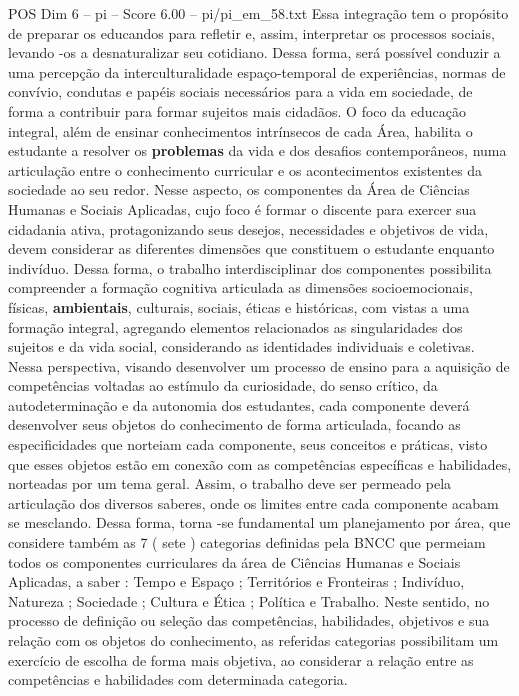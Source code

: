 \begin{textsample}{POS Dim 6 – pi – Score 6.00 – pi/pi\_em\_58.txt}
Essa integração tem o propósito de preparar os educandos para refletir e, assim, interpretar os processos sociais, levando -os a desnaturalizar seu cotidiano.
Dessa forma, será possível conduzir a uma percepção da interculturalidade espaço-temporal de experiências, normas de convívio, condutas e papéis sociais necessários para a vida em sociedade, de forma a contribuir para formar sujeitos mais cidadãos.
O foco da educação integral, além de ensinar conhecimentos intrínsecos de cada Área, habilita o estudante a resolver os \textbf{problemas} da vida e dos desafios contemporâneos, numa articulação entre o conhecimento curricular e os acontecimentos existentes da sociedade ao seu redor.
Nesse aspecto, os componentes da Área de Ciências Humanas e Sociais Aplicadas, cujo foco é formar o discente para exercer sua cidadania ativa, protagonizando seus desejos, necessidades e objetivos de vida, devem considerar as diferentes dimensões que constituem o estudante enquanto indivíduo.
Dessa forma, o trabalho interdisciplinar dos componentes possibilita compreender a formação cognitiva articulada as dimensões socioemocionais, físicas, \textbf{ambientais}, culturais, sociais, éticas e históricas, com vistas a uma formação integral, agregando elementos relacionados as singularidades dos sujeitos e da vida social, considerando as identidades individuais e coletivas.
Nessa perspectiva, visando desenvolver um processo de ensino para a aquisição de competências voltadas ao estímulo da curiosidade, do senso crítico, da autodeterminação e da autonomia dos estudantes, cada componente deverá desenvolver seus objetos do conhecimento de forma articulada, focando as especificidades que norteiam cada componente, seus conceitos e práticas, visto que esses objetos estão em conexão com as competências específicas e habilidades, norteadas por um tema geral.
Assim, o trabalho deve ser permeado pela articulação dos diversos saberes, onde os limites entre cada componente acabam se mesclando.
Dessa forma, torna -se fundamental um planejamento por área, que considere também as 7 ( sete ) categorias definidas pela BNCC que permeiam todos os componentes curriculares da área de Ciências Humanas e Sociais Aplicadas, a saber : Tempo e Espaço ; Territórios e Fronteiras ; Indivíduo, Natureza ; Sociedade ; Cultura e Ética ; Política e Trabalho.
Neste sentido, no processo de definição ou seleção das competências, habilidades, objetivos e sua relação com os objetos do conhecimento, as referidas categorias possibilitam um exercício de escolha de forma mais objetiva, ao considerar a relação entre as competências e habilidades com determinada categoria.

\end{textsample}
